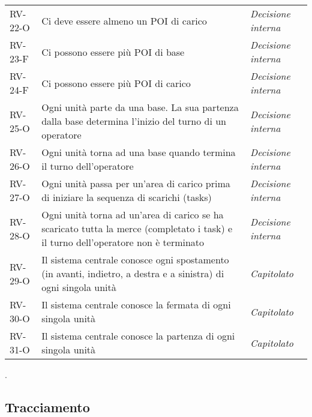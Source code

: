 \begin{longtable}{ 
		>{\centering}p{} 
		>{}p{}
		>{\centering \it}p{} }
RV-22-O & Ci deve essere almeno un POI di carico & Decisione interna\tabularnewline
RV-23-F & Ci possono essere più POI di base & Decisione interna\tabularnewline
RV-24-F & Ci possono essere più POI di carico & Decisione interna\tabularnewline
RV-25-O & Ogni unità parte da una base. La sua partenza dalla base determina l'inizio del turno di un operatore & Decisione interna\tabularnewline
RV-26-O & Ogni unità torna ad una base quando termina il turno dell’operatore & Decisione interna\tabularnewline
RV-27-O & Ogni unità passa per un’area di carico prima di iniziare la sequenza di scarichi (tasks) & Decisione interna\tabularnewline
RV-28-O & Ogni unità torna ad un'area di carico se ha scaricato tutta la merce (completato i task) e il turno dell’operatore non è terminato & Decisione interna\tabularnewline
RV-29-O & Il sistema centrale conosce ogni spostamento (in avanti, indietro, a destra e a sinistra) di ogni singola unità & Capitolato\tabularnewline
RV-30-O & Il sistema centrale conosce la fermata di ogni singola unità & Capitolato\tabularnewline
RV-31-O & Il sistema centrale conosce la partenza di ogni singola unità & Capitolato\tabularnewline
\end{longtable}.
\newline
\newline
\subsection{Tracciamento}
